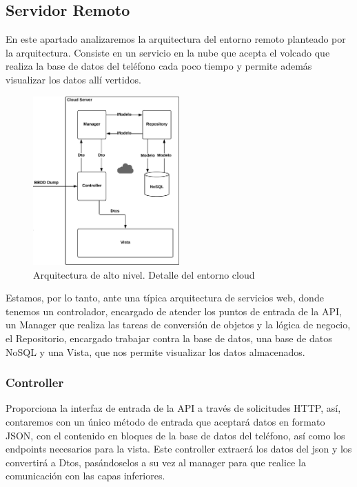 \documentclass[12pt,a4paper,oneside]{book} %
\begin{document}
\subsection{Servidor Remoto}
En este apartado analizaremos la arquitectura del entorno remoto planteado por la arquitectura. Consiste en un servicio en la nube que acepta el volcado que realiza la base de datos del teléfono cada poco tiempo y permite además visualizar los datos allí vertidos. 
\begin{figure}[hbt]
  \begin{center} \setlength{\unitlength}{0.0105in}
     \includegraphics[width=0.5\textwidth]{pictures/architecture/highLevelArch03.png}
  \end{center}
  \caption[Arquitectura de alto nivel. Cloud]{Arquitectura de alto nivel. Detalle del entorno cloud}
\end{figure}
Estamos, por lo tanto, ante una típica arquitectura de servicios web, donde tenemos un controlador, encargado de atender los puntos de entrada de la API, un Manager que realiza las tareas de conversión de objetos y la lógica de negocio, el Repositorio, encargado trabajar contra la base de datos, una base de datos NoSQL y una Vista, 	que nos permite visualizar los datos almacenados. 
\subsubsection{Controller}
Proporciona la interfaz de entrada de la API a través de solicitudes HTTP, así, contaremos con un único método de entrada que aceptará datos en formato JSON, con el contenido en bloques de la base de datos del teléfono, así como los endpoints necesarios para la vista. 
\newline
\newline
Este controller extraerá los datos del json y los convertirá a Dtos, pasándoselos a su vez al manager para que realice la comunicación con las capas inferiores. 
\end{document}
